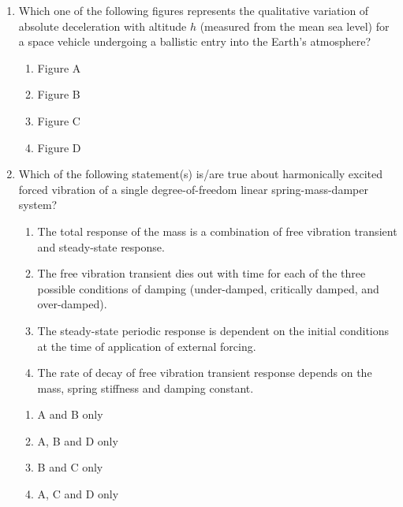 \documentclass{article}
\begin{document}
\begin{enumerate}[leftmargin=*, resume]
\item Which one of the following figures represents the qualitative variation of absolute deceleration with altitude $h$ (measured from the mean sea level) for a space vehicle undergoing a ballistic entry into the Earth’s atmosphere?
\begin{multicols}{4}
\begin{enumerate}
\item Figure A
\item Figure B
\item Figure C
\item Figure D
\end{enumerate}
\end{multicols}

\item Which of the following statement(s) is/are true about harmonically excited forced vibration of a single degree-of-freedom linear spring-mass-damper system?
\begin{enumerate}
\item The total response of the mass is a combination of free vibration transient and steady-state response.
\item The free vibration transient dies out with time for each of the three possible conditions of damping (under-damped, critically damped, and over-damped).
\item The steady-state periodic response is dependent on the initial conditions at the time of application of external forcing.
\item The rate of decay of free vibration transient response depends on the mass, spring stiffness and damping constant.
\end{enumerate}
\begin{multicols}{4}
\begin{enumerate}
\item A and B only
\item A, B and D only
\item B and C only
\item A, C and D only
\end{enumerate}
\end{multicols}


\end{enumerate}
\end{document}
